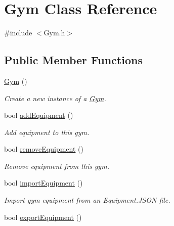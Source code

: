 \hypertarget{class_gym}{}\section{Gym Class Reference}
\label{class_gym}


{\ttfamily \#include $<$Gym.\+h$>$}

\subsection*{Public Member Functions}
\begin{DoxyCompactItemize}
\item 
\hypertarget{class_gym_aeff68740b0a85da7a90889f8d9d71557}{}\hyperlink{class_gym_aeff68740b0a85da7a90889f8d9d71557}{Gym} ()\label{class_gym_aeff68740b0a85da7a90889f8d9d71557}

\begin{DoxyCompactList}\small\item\em Create a new instance of a \hyperlink{class_gym}{Gym}. \end{DoxyCompactList}\item 
\hypertarget{class_gym_a879b8eafc463502841fd1bc05d782786}{}bool \hyperlink{class_gym_a879b8eafc463502841fd1bc05d782786}{add\+Equipment} ()\label{class_gym_a879b8eafc463502841fd1bc05d782786}

\begin{DoxyCompactList}\small\item\em Add equipment to this gym. \end{DoxyCompactList}\item 
\hypertarget{class_gym_a573d4d28cd94b2fe5333d5181ecd1b29}{}bool \hyperlink{class_gym_a573d4d28cd94b2fe5333d5181ecd1b29}{remove\+Equipment} ()\label{class_gym_a573d4d28cd94b2fe5333d5181ecd1b29}

\begin{DoxyCompactList}\small\item\em Remove equipment from this gym. \end{DoxyCompactList}\item 
\hypertarget{class_gym_a03152ecf685b38fd71e22d87137a4304}{}bool \hyperlink{class_gym_a03152ecf685b38fd71e22d87137a4304}{import\+Equipment} ()\label{class_gym_a03152ecf685b38fd71e22d87137a4304}

\begin{DoxyCompactList}\small\item\em Import gym equipment from an Equipment.\+J\+S\+O\+N file. \end{DoxyCompactList}\item 
\hypertarget{class_gym_ae28f99e92a02f9fea26fad23ec256293}{}bool \hyperlink{class_gym_ae28f99e92a02f9fea26fad23ec256293}{export\+Equipment} ()\label{class_gym_ae28f99e92a02f9fea26fad23ec256293}


\end{DoxyCompactItemize}
